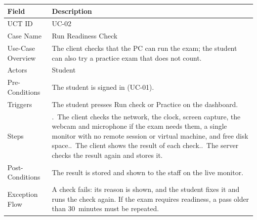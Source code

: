\begin{lrbox}{\uctbox}{\small\renewcommand{\arraystretch}{1.1}\setlength{\tabcolsep}{6pt}%
\begin{tabular}{>{\raggedright\arraybackslash}p{3.6cm}>{\raggedright\arraybackslash}p{\dimexpr\textwidth-3.6cm-4\tabcolsep\relax}}
\hline\hline
\textbf{Field} & \textbf{Description} \\ \hline
UCT ID & UC-02 \\
Case Name & Run Readiness Check \\
Use-Case Overview & The client checks that the PC can run the exam; the student can also try a practice exam that does not count. \\
Actors & Student \\
Pre-Conditions & The student is signed in (UC-01). \\
Triggers & The student presses Run check or Practice on the dashboard. \\
Steps & 1.~The client checks the network, the clock, screen capture, the webcam and microphone if the exam needs them, a single monitor with no remote session or virtual machine, and free disk space.\newline
2.~The client shows the result of each check.\newline
3.~The server checks the result again and stores it. \\
Post-Conditions & The result is stored and shown to the staff on the live monitor. \\
Exception Flow & A check fails: its reason is shown, and the student fixes it and runs the check again. If the exam requires readiness, a pass older than 30~minutes must be repeated. \\
\hline\hline
\end{tabular}}\end{lrbox}
\begin{table}[H]
\centering
\caption{Use Case Table for Run Readiness Check}\label{tab:uc02}
\vspace{4pt}
\usebox{\uctbox}
\end{table}

